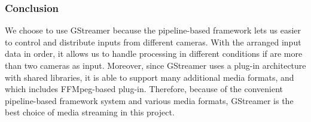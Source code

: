 \subsubsection{Conclusion}
We choose to use GStreamer because the pipeline-based framework lets us easier to control and distribute 
inputs from different cameras. With the arranged input data in order, it allows us to handle processing 
in different conditions if are more than two cameras as input. Moreover, since GStreamer uses a plug-in 
architecture with shared libraries, it is able to support many additional media formats, and which 
includes FFMpeg-based plug-in. Therefore, because of the convenient pipeline-based framework system and 
various media formats, GStreamer is the best choice of media streaming in this project.\\